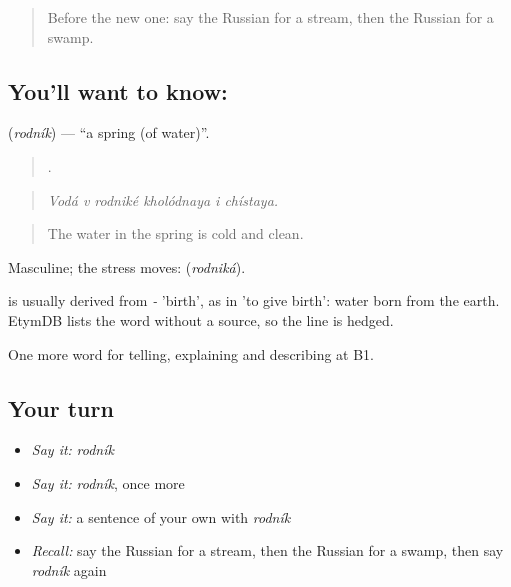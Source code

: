 \label{lesson:RU-C460-rodnik}



\begin{quote}
Before the new one: say the Russian for a stream, then the Russian for a swamp.
\end{quote}

\subsection*{You'll want to know: }
\textbf{} (\emph{rodník}) — \textquotedblleft{}a spring (of water)\textquotedblright{}.

\begin{quote}
     .
\end{quote}

\begin{quote}
\emph{Vodá v rodniké kholódnaya i chístaya.}
\end{quote}

\begin{quote}
The water in the spring is cold and clean.
\end{quote}

Masculine; the stress moves: \emph{} (\emph{rodniká}).

\begin{cousinweb}
\emph{} is usually derived from \emph{-} 'birth', as in \emph{} 'to give birth': water born from the earth. EtymDB lists the word without a source, so the line is hedged.
\end{cousinweb}

\begin{grammarlens}[title={What you've built}]
One more word for telling, explaining and describing at B1.
\end{grammarlens}

\subsection*{Your turn}
\begin{itemize}
\raggedright
  \item \emph{Say it:} \emph{rodník}
  \item \emph{Say it:} \emph{rodník}, once more
  \item \emph{Say it:} a sentence of your own with \emph{rodník}
  \item \emph{Recall:} say the Russian for a stream, then the Russian for a swamp, then say \emph{rodník} again
\end{itemize}

